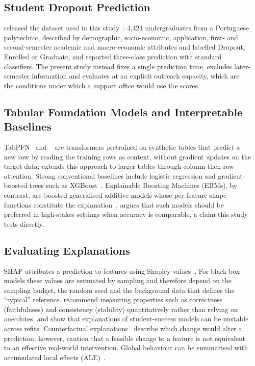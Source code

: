 \subsection{Student Dropout Prediction}

\citet{realinho2022predicting} released the dataset used in this study~\citep{realinho2021uci}: 4,424
undergraduates from a Portuguese polytechnic, described by demographic, socio-economic, application,
first- and second-semester academic and macro-economic attributes and labelled Dropout, Enrolled or
Graduate, and reported three-class prediction with standard classifiers. The present study instead
fixes a single prediction time, excludes later-semester information and evaluates at an explicit
outreach capacity, which are the conditions under which a support office would use the scores.

\subsection{Tabular Foundation Models and Interpretable Baselines}

TabPFN~\citep{hollmann2025tabpfn} and \tabicl~\citep{qu2025tabicl} are transformers pretrained on
synthetic tables that predict a new row by reading the training rows as context, without gradient
updates on the target data; \tabicl extends this approach to larger tables through column-then-row
attention. Strong conventional baselines include logistic regression and gradient-boosted trees
such as XGBoost~\citep{chen2016xgboost}. Explainable Boosting Machines (EBMs), by contrast, are
boosted generalised additive models whose per-feature shape functions constitute the
explanation~\citep{lou2013ebm, caruana2015intelligible}. \citet{rudin2019stop} argues that such models
should be preferred in high-stakes settings when accuracy is comparable, a claim this study tests
directly.

\subsection{Evaluating Explanations}

SHAP attributes a prediction to features using Shapley values~\citep{lundberg2017shap}. For
black-box models these values are estimated by sampling and therefore depend on the sampling
budget, the random seed and the background data that defines the ``typical'' reference.
\citet{nauta2023evaluation} recommend measuring properties such as correctness (faithfulness) and
consistency (stability) quantitatively rather than relying on anecdotes, and
\citet{tiukhova2024stability} show that explanations of student-success models can be unstable
across refits. Counterfactual explanations~\citep{wachter2017counterfactual} describe which change
would alter a prediction; however, \citet{karimi2021recourse} caution that a feasible change to a
feature is not equivalent to an effective real-world intervention. Global behaviour can be
summarised with accumulated local effects (ALE)~\citep{apley2020ale}.

